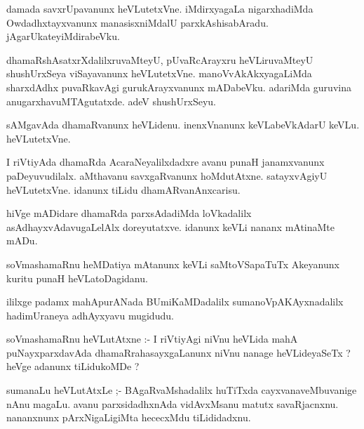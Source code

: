 \documentclass{article}
\begin{document}
\begin{mn}
damada savxrUpavanunx heVLutetxVne. iMdirxyagaLa nigarxhadiMda Owdadhxtayxvanunx 
manasisxniMdalU parxkAshisabAradu.  jAgarUkateyiMdirabeVku.
\end{mn}

\begin{mn}
dhamaRshAsatxrXdalilxruvaMteyU,  pUvaRcArayxru  heVLiruvaMteyU  shushUrxSeya 
 viSayavanunx  heVLutetxVne. manoVvAkAkxyagaLiMda sharxdAdhx puvaRkavAgi 
 gurukArayxvanunx mADabeVku. adariMda guruvina anugarxhavuMTAgutatxde.  adeV shushUrxSeyu.
\end{mn}

\begin{mn}
sAMgavAda  dhamaRvanunx heVLidenu.  inenxVnanunx  keVLabeVkAdarU keVLu.  heVLutetxVne.
\end{mn}

\begin{mn}
I riVtiyAda dhamaRda AcaraNeyalilxdadxre  avanu punaH janamxvanunx  paDeyuvudilalx. 
 aMthavanu savxgaRvanunx  hoMdutAtxne.  satayxvAgiyU heVLutetxVne. idanunx 
 tiLidu dhamARvanAnxcarisu.
\end{mn}

\begin{mn}
hiVge mADidare  dhamaRda parxsAdadiMda loVkadalilx asAdhayxvAdavugaLelAlx 
doreyutatxve.  idanunx keVLi nananx mAtinaMte mADu.
\end{mn}

\begin{mn}
soVmashamaRnu heMDatiya mAtanunx  keVLi saMtoVSapaTuTx Akeyanunx kuritu  punaH heVLatoDagidanu.
\end{mn}

\begin{mn}
ililxge padamx mahApurANada BUmiKaMDadalilx  sumanoVpAKAyxnadalilx hadimUraneya adhAyxyavu mugidudu.
\end{mn}


\begin{mn}
soVmashamaRnu heVLutAtxne :- I riVtiyAgi niVnu heVLida mahA puNayxparxdavAda 
 dhamaRrahasayxgaLanunx  niVnu  nanage  heVLideyaSeTx ?  heVge adanunx tiLidukoMDe ?
\end{mn}

\begin{mn}
sumanaLu heVLutAtxLe ;- BAgaRvaMshadalilx huTiTxda cayxvanaveMbuvanige nAnu magaLu.
 avanu parxsidadhxnAda vidAvxMsanu matutx savaRjacnxnu.  nananxnunx pArxNigaLigiMta 
 hececxMdu tiLididadxnu.
\end{mn}
\end{document}

